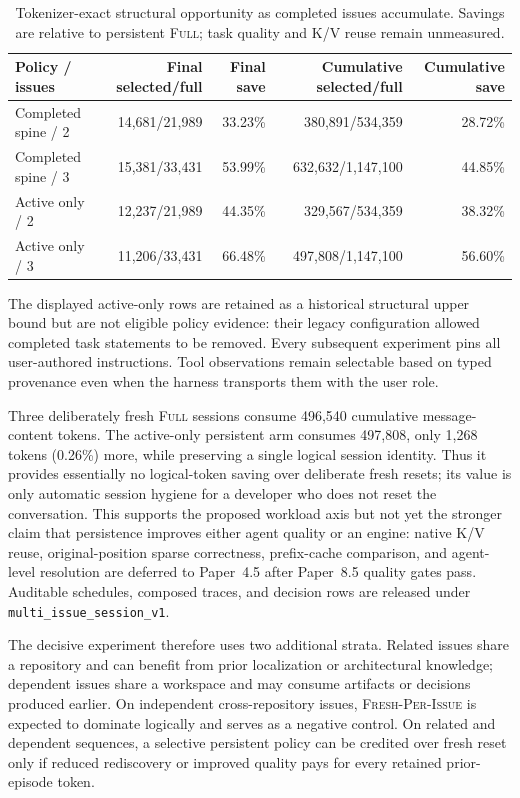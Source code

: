 \documentclass[11pt]{article}
\begin{document}
\begin{table}[H]
\centering
\small
\caption{Tokenizer-exact structural opportunity as completed issues accumulate.
Savings are relative to persistent \textsc{Full}; task quality and K/V reuse
remain unmeasured.}
\label{tab:persistent-session-pilot}
\begin{tabular}{lrrrr}
\toprule
Policy / issues & Final selected/full & Final save & Cumulative selected/full & Cumulative save \\
\midrule
Completed spine / 2 & 14,681/21,989 & 33.23\% & 380,891/534,359 & 28.72\% \\
Completed spine / 3 & 15,381/33,431 & 53.99\% & 632,632/1,147,100 & 44.85\% \\
Active only / 2 & 12,237/21,989 & 44.35\% & 329,567/534,359 & 38.32\% \\
Active only / 3 & 11,206/33,431 & 66.48\% & 497,808/1,147,100 & 56.60\% \\
\bottomrule
\end{tabular}
\end{table}

The displayed active-only rows are retained as a historical structural upper
bound but are not eligible policy evidence: their legacy configuration allowed
completed task statements to be removed.  Every subsequent experiment pins
all user-authored instructions.  Tool observations remain selectable based on
typed provenance even when the harness transports them with the user role.

Three deliberately fresh \textsc{Full} sessions consume 496,540 cumulative
message-content tokens.  The active-only persistent arm consumes 497,808,
only 1,268 tokens (0.26\%) more, while preserving a single logical session
identity.  Thus it provides essentially no logical-token saving over deliberate
fresh resets; its value is only automatic session hygiene for a developer who
does not reset the conversation.  This supports the proposed workload axis but
not yet the stronger claim that persistence improves either agent quality or an
engine: native K/V reuse, original-position
sparse correctness, prefix-cache comparison, and agent-level resolution are
deferred to Paper~4.5 after Paper~8.5 quality gates pass.  Auditable schedules,
composed traces, and decision rows are released under
\texttt{multi\_issue\_session\_v1}.

The decisive experiment therefore uses two additional strata.  Related issues
share a repository and can benefit from prior localization or architectural
knowledge; dependent issues share a workspace and may consume artifacts or
decisions produced earlier.  On independent cross-repository issues,
\textsc{Fresh-Per-Issue} is expected to dominate logically and serves as a
negative control.  On related and dependent sequences, a selective persistent
policy can be credited over fresh reset only if reduced rediscovery or improved
quality pays for every retained prior-episode token.
\end{document}
